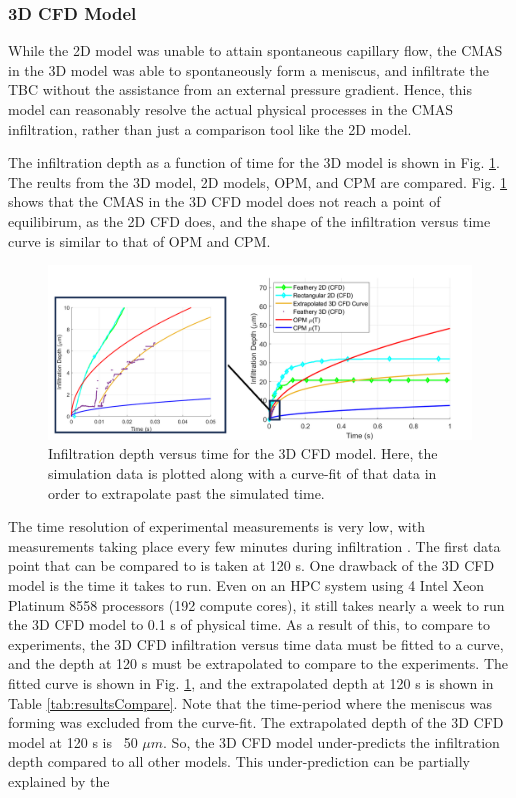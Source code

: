 \documentclass[%
 aip,
 amsmath,amssymb,
 reprint,%
floatfix]{revtex4-1}
\begin{document}
\subsubsection{3D CFD Model}

While the 2D model was unable to attain spontaneous capillary flow, the CMAS in the 3D model was able to spontaneously form a meniscus, and infiltrate the TBC without the assistance from an external pressure gradient. Hence, this model can reasonably resolve the actual physical processes in the CMAS infiltration, rather than just a comparison tool like the 2D model. 

The infiltration depth as a function of time for the 3D model is shown in Fig. \ref{fig:3D_results}. The reults from the 3D model, 2D models, OPM, and CPM are compared. Fig. \ref{fig:3D_results} shows that the CMAS in the 3D CFD model does not reach a point of equilibirum, as the 2D CFD does, and the shape of the infiltration versus time curve is similar to that of OPM and CPM. 

\begin{figure}
    \centering
    \includegraphics[width=\linewidth]{Figures/3D_results.png}
    \caption{Infiltration depth versus time for the 3D CFD model. Here, the simulation data is plotted along with a curve-fit of that data in order to extrapolate past the simulated time.}
    \label{fig:3D_results}
\end{figure}

The time resolution of experimental measurements is very low, with measurements taking place every few minutes during infiltration \cite{Naraparaju2017}. The first data point that can be compared to is taken at 120 s. One drawback of the 3D CFD model is the time it takes to run. Even on an HPC system using 4 Intel Xeon Platinum 8558 processors (192 compute cores), it still takes nearly a week to run the 3D CFD model to 0.1 s of physical time. As a result of this, to compare to experiments, the 3D CFD infiltration versus time data must be fitted to a curve, and the depth at 120 s must be extrapolated to compare to the experiments. The fitted curve is shown in Fig. \ref{fig:3D_results}, and the extrapolated depth at 120 s is shown in Table \ref{tab:resultsCompare}. Note that the time-period where the meniscus was forming was excluded from the curve-fit. The extrapolated depth of the 3D CFD model at 120 s is ~50 $\mu m$. So, the 3D CFD model under-predicts the infiltration depth compared to all other models. This under-prediction can be partially explained by the 
\end{document}
